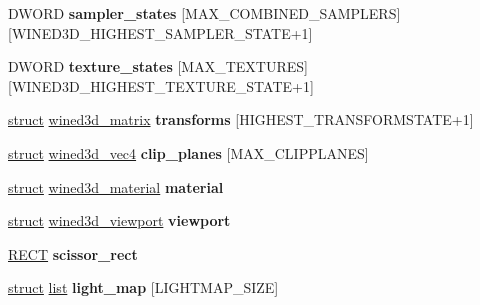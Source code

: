 \begin{DoxyCompactItemize}
D\+W\+O\+RD {\bfseries sampler\+\_\+states} \mbox{[}M\+A\+X\+\_\+\+C\+O\+M\+B\+I\+N\+E\+D\+\_\+\+S\+A\+M\+P\+L\+E\+RS\mbox{]}\mbox{[}W\+I\+N\+E\+D3\+D\+\_\+\+H\+I\+G\+H\+E\+S\+T\+\_\+\+S\+A\+M\+P\+L\+E\+R\+\_\+\+S\+T\+A\+TE+1\mbox{]}
\item 
\mbox{\label{structwined3d__state_a7e866fb033e647da1faf197759e29673}} 
D\+W\+O\+RD {\bfseries texture\+\_\+states} \mbox{[}M\+A\+X\+\_\+\+T\+E\+X\+T\+U\+R\+ES\mbox{]}\mbox{[}W\+I\+N\+E\+D3\+D\+\_\+\+H\+I\+G\+H\+E\+S\+T\+\_\+\+T\+E\+X\+T\+U\+R\+E\+\_\+\+S\+T\+A\+TE+1\mbox{]}
\item 
\mbox{\label{structwined3d__state_a1b0efa8175ea44529ea9c0d97c0fe8e5}} 
\hyperlink{interfacestruct}{struct} \hyperlink{structwined3d__matrix}{wined3d\+\_\+matrix} {\bfseries transforms} \mbox{[}H\+I\+G\+H\+E\+S\+T\+\_\+\+T\+R\+A\+N\+S\+F\+O\+R\+M\+S\+T\+A\+TE+1\mbox{]}
\item 
\mbox{\label{structwined3d__state_a51f14dccd9a0e1074e61e951961d91e0}} 
\hyperlink{interfacestruct}{struct} \hyperlink{structwined3d__vec4}{wined3d\+\_\+vec4} {\bfseries clip\+\_\+planes} \mbox{[}M\+A\+X\+\_\+\+C\+L\+I\+P\+P\+L\+A\+N\+ES\mbox{]}
\item 
\mbox{\label{structwined3d__state_a9c2790b545c749c82f604f7c09bdc7aa}} 
\hyperlink{interfacestruct}{struct} \hyperlink{structwined3d__material}{wined3d\+\_\+material} {\bfseries material}
\item 
\mbox{\label{structwined3d__state_aa371f4e5efca518f7c3e48c7e2aa4f27}} 
\hyperlink{interfacestruct}{struct} \hyperlink{structwined3d__viewport}{wined3d\+\_\+viewport} {\bfseries viewport}
\item 
\mbox{\label{structwined3d__state_ab89240525e12f3f42c6551eac29eaac4}} 
\hyperlink{structtag_r_e_c_t}{R\+E\+CT} {\bfseries scissor\+\_\+rect}
\item 
\mbox{\label{structwined3d__state_ae3645422dcb8f965ffca8e6662ee89ff}} 
\hyperlink{interfacestruct}{struct} \hyperlink{classlist}{list} {\bfseries light\+\_\+map} \mbox{[}L\+I\+G\+H\+T\+M\+A\+P\+\_\+\+S\+I\+ZE\mbox{]}
\item 

\end{DoxyCompactItemize}
